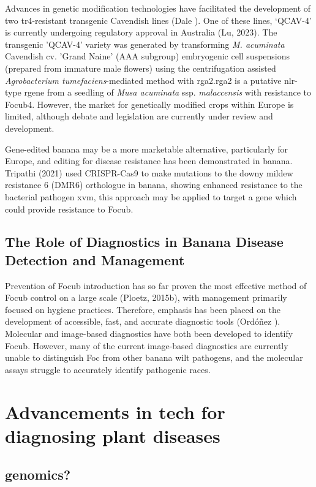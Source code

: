 {Advances in genetic modification technologies have facilitated the development of two \ac{tr4}-resistant transgenic Cavendish lines (Dale ). One of these lines, ‘QCAV-4’ is currently undergoing regulatory approval in Australia (Lu, 2023). The transgenic 'QCAV-4' variety was generated by transforming \textit{M. acuminata }Cavendish cv. 'Grand Naine' (AAA subgroup) embryogenic cell suspensions (prepared from immature male flowers) using the centrifugation assisted \textit{Agrobacterium tumefaciens}-mediated method with \ac{rga2}.\ac{rga2} is a putative \ac{nlr}-type \ac{rgene} from a seedling of \textit{Musa acuminata} ssp. \textit{malaccensis} with resistance to \ac{Focub4}. However, the market for genetically modified crops within Europe is limited, although debate and legislation are currently under review and development. 

Gene-edited banana may be a more marketable alternative, particularly for Europe, and editing for disease resistance has been demonstrated in banana. Tripathi \et (2021) used CRISPR-Cas9 to make mutations to the downy mildew resistance 6 (DMR6) orthologue in banana, showing enhanced resistance to the bacterial pathogen \ac{xvm}, this approach may be applied to target a gene which could provide resistance to \ac{Focub}.  

\subsection{The Role of Diagnostics in Banana Disease Detection and Management}

Prevention of \ac{Focub} introduction has so far proven the most effective method of \ac{Focub} control on a large scale (Ploetz, 2015b), with management primarily focused on hygiene practices. Therefore, emphasis has been placed on the development of accessible, fast, and accurate diagnostic tools (Ordóñez ). Molecular and image-based diagnostics have both been developed to identify \ac{Focub}. However, many of the current image-based diagnostics are currently unable to distinguish Foc from other banana wilt pathogens, and the molecular assays struggle to accurately identify pathogenic races.  
 

\section{Advancements in tech for diagnosing plant diseases}
\subsection{genomics?}
}
